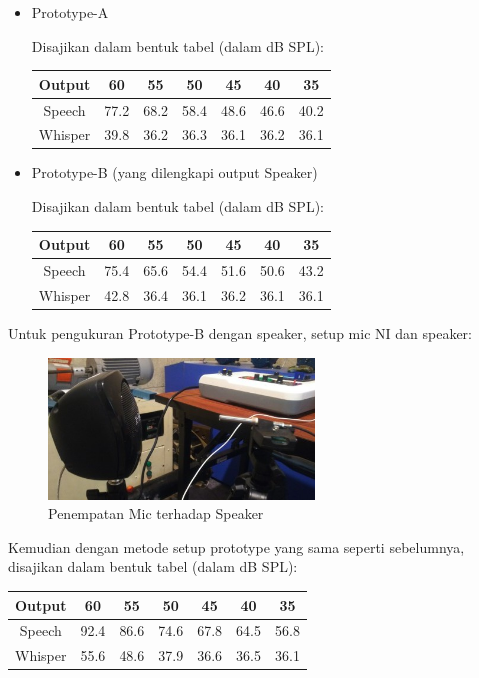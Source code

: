 \documentclass[12pt,]{article}
\begin{document}
	\begin{itemize}
		\item Prototype-A
		
		Disajikan dalam bentuk tabel (dalam dB SPL):
		\begin{center}
			\begin{tabular}{|c|c|c|c|c|c|c|}
				\hline
				Output & 60 & 55 & 50 & 45 & 40 & 35\\ [0.5ex]
				\hline\hline
				Speech & 77.2 & 68.2 & 58.4 & 48.6 & 46.6 & 40.2 \\
				\hline
				Whisper & 39.8 & 36.2 & 36.3 & 36.1 & 36.2 & 36.1 \\
				\hline
			\end{tabular}
		\end{center}

		\item Prototype-B (yang dilengkapi output Speaker)
		
		Disajikan dalam bentuk tabel (dalam dB SPL):
		\begin{center}
			\begin{tabular}{|c|c|c|c|c|c|c|}
				\hline
				Output & 60 & 55 & 50 & 45 & 40 & 35\\ [0.5ex]
				\hline\hline
				Speech & 75.4 & 65.6 & 54.4 & 51.6 & 50.6 & 43.2 \\
				\hline
				Whisper & 42.8 & 36.4 & 36.1 & 36.2 & 36.1 & 36.1 \\
				\hline
			\end{tabular}
		\end{center}
	\end{itemize}

	Untuk pengukuran Prototype-B dengan speaker, setup mic NI dan speaker:
	
	\begin{figure}[!ht]
		\centering
		\includegraphics[width=200pt]{images/ukur_speaker}
		\caption{Penempatan Mic terhadap Speaker}
	\end{figure}

	Kemudian dengan metode setup prototype yang sama seperti sebelumnya,
	disajikan dalam bentuk tabel (dalam dB SPL):
	\begin{center}
		\begin{tabular}{|c|c|c|c|c|c|c|}
			\hline
			Output & 60 & 55 & 50 & 45 & 40 & 35\\ [0.5ex]
			\hline\hline
			Speech & 92.4 & 86.6 & 74.6 & 67.8 & 64.5 & 56.8 \\
			\hline
			Whisper & 55.6 & 48.6 & 37.9 & 36.6 & 36.5 & 36.1 \\
			\hline
		\end{tabular}
	\end{center}
\end{document}
